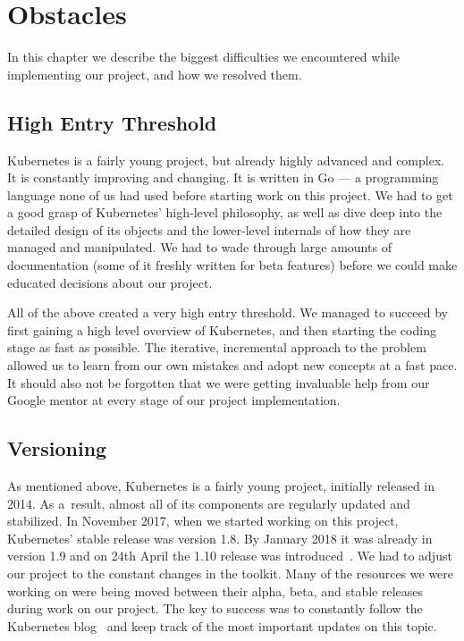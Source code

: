 \chapter{Obstacles}
In this chapter we describe the biggest difficulties we encountered while implementing our project,
and how we resolved them.

\section{High Entry Threshold}
Kubernetes is a fairly young project, but already highly advanced and complex. It is constantly
improving and changing. It is written in Go --- a programming language none of
us had used before starting work on this project. We had to get a good grasp of Kubernetes’
high-level philosophy, as well as dive deep into the detailed design of its objects and the
lower-level internals of how they are managed and manipulated. We had to wade through large amounts
of documentation (some of it freshly written for beta features) before we could make educated
decisions about our project.

All of the above created a very high entry threshold. We managed to succeed by
first gaining a high level overview of Kubernetes, and then starting the coding stage as fast as
possible. The iterative, incremental approach to the problem allowed us to learn from our own mistakes
and adopt new concepts at a fast pace. It should also not be forgotten that we were getting
invaluable help from our Google mentor at every stage of our project implementation.

\section{Versioning}
As mentioned above, Kubernetes is a fairly young project, initially released in 2014. As a~result,
almost all of its components are regularly updated and stabilized. In November 2017, when we
started working on this project, Kubernetes' stable release was version 1.8. By January 2018 it was
already in version 1.9 and on 24th April the 1.10 release was introduced~\cite{releases}. We had to adjust our
project to the constant changes in the toolkit. Many of the resources we were working on were
being moved between their alpha, beta, and stable releases during work on our project. The key to
success was to constantly follow the Kubernetes blog~\cite{blog} and keep track of the most important updates
on this topic.

